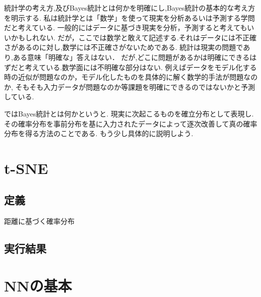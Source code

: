 \documentclass{ujarticle}
\begin{document}
統計学の考え方,及びBayes統計とは何かを明確にし,Bayes統計の基本的な考え方を明示する.
私は統計学とは「数学」を使って現実を分析あるいは予測する学問だと考えている.
一般的にはデータに基づき現実を分析，予測すると考えてもいいかもしれない.
だが，ここでは数学と敢えて記述する.それはデータには不正確さがあるのに対し,数学には不正確さがないためである.
統計は現実の問題であり,ある意味「明確な」答えはない．
だが,どこに問題があるかは明確にできるはずだと考えている.数学面には不明確な部分はない.
例えばデータをモデル化する時の近似が問題なのか，モデル化したものを具体的に解く数学的手法が問題なのか,
そもそも入力データが問題なのか等課題を明確にできるのではないかと予測している.

ではBayes統計とは何かというと.
現実に次起こるものを確立分布として表現し.
その確率分布を事前分布を基に入力されたデータによって逐次改善して真の確率分布を得る方法のことである.
もう少し具体的に説明しよう.




\section{t-SNE}
\label{sec:t-SNE}
\subsection{定義}
\label{sub:定義}
距離に基づく確率分布

\subsection{実行結果}
\label{sub:実行結果}

\section{NNの基本}
\label{sec:NNの基本}
\end{document}
